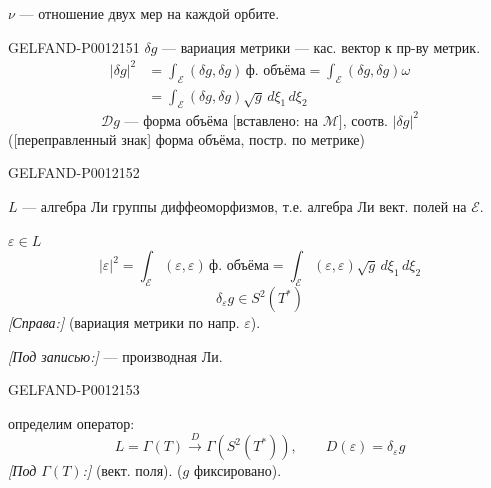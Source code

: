 \(\nu\) --- отношение двух мер на каждой орбите.


\begin{GelfandAdjacentEvidence}{GELFAND-P001215}{1}
\(\delta g\) --- вариация метрики --- кас. вектор к пр-ву метрик.
\begin{equation*}
\begin{aligned}
|\delta g|^2
&=\int_{\mathcal E}(\delta g,\delta g)\,\text{ф. объёма}
=\int_{\mathcal E}(\delta g,\delta g)\omega\\
&=\int_{\mathcal E}(\delta g,\delta g)\sqrt g\,d\xi_1\,d\xi_2
\end{aligned}\tag{8}
\end{equation*}
\begin{equation*}
\mathcal Dg\text{ --- форма объёма [вставлено: на }\mathcal M\text{], соотв. }|\delta g|^2\tag{9}
\end{equation*}
([переправленный знак] форма объёма, постр. по метрике)
\end{GelfandAdjacentEvidence}
\begin{GelfandAdjacentEvidence}{GELFAND-P001215}{2}


\(L\) --- алгебра Ли группы диффеоморфизмов, т.е. алгебра Ли вект. полей на \(\mathcal E\).

\(\varepsilon\in L\)
\begin{equation*}
|\varepsilon|^2=\int_{\mathcal E}(\varepsilon,\varepsilon)\,\text{ф. объёма}
=\int_{\mathcal E}(\varepsilon,\varepsilon)\sqrt g\,d\xi_1\,d\xi_2\tag{10}
\end{equation*}
\begin{equation*}
\delta_\varepsilon g\in S^2(T^*)\tag{11}
\end{equation*}
\textit{[Справа:]} (вариация метрики по напр. \(\varepsilon\)).

\textit{[Под записью:]} --- производная Ли.
\end{GelfandAdjacentEvidence}
\begin{GelfandAdjacentEvidence}{GELFAND-P001215}{3}


определим оператор:
\begin{equation*}
L=\Gamma(T)\overset{D}{\longrightarrow}\Gamma(S^2(T^*)),
\qquad D(\varepsilon)=\delta_\varepsilon g\tag{12}
\end{equation*}
\textit{[Под \(\Gamma(T)\):]} (вект. поля). (\(g\) фиксировано).
\end{GelfandAdjacentEvidence}

